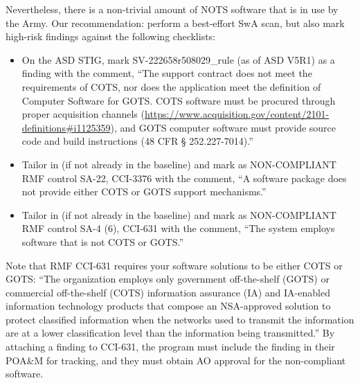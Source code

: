 Nevertheless, there is a non-trivial amount of NOTS software that is in use by the Army. Our recommendation: perform a best-effort SwA scan, but also mark high-risk findings against the following checklists:
\begin{itemize}
	\item On the ASD STIG, mark SV-222658r508029\_rule (as of ASD V5R1) as a finding with the comment, ``The support contract does not meet the requirements of COTS, nor does the application meet the definition of Computer Software for GOTS. COTS software must be procured through proper acquisition channels (\url{https://www.acquisition.gov/content/2101-definitions#i1125359}), and GOTS computer software must provide source code and build instructions (48 CFR § 252.227-7014).''
	\item Tailor in (if not already in the baseline) and mark as NON-COMPLIANT RMF control SA-22, CCI-3376 with the comment, ``A software package does not provide either COTS or GOTS support mechanisms.''
	\item Tailor in (if not already in the baseline) and mark as NON-COMPLIANT RMF control SA-4 (6), CCI-631 with the comment, ``The system employs software that is not COTS or GOTS.''
\end{itemize}

Note that RMF CCI-631 requires your software solutions to be either COTS or GOTS: ``The organization employs only government off-the-shelf (GOTS) or commercial off-the-shelf (COTS) information assurance (IA) and IA-enabled information technology products that compose an NSA-approved solution to protect classified information when the networks used to transmit the information are at a lower classification level than the information being transmitted.'' By attaching a finding to CCI-631, the program must include the finding in their POA\&M for tracking, and they must obtain AO approval for the non-compliant software.
